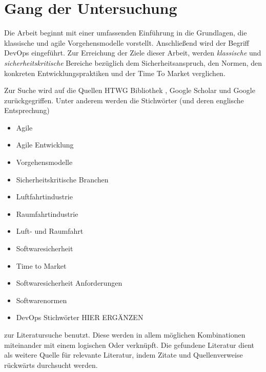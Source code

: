\section{Gang der Untersuchung}

Die Arbeit beginnt mit einer umfassenden Einführung in die Grundlagen,
die klassische und agile Vorgehensmodelle vorstellt.
Anschließend wird der Begriff DevOps eingeführt.
Zur Erreichung der Ziele dieser Arbeit, werden \emph{klassische} und \emph{sicherheitskritische} Bereiche bezüglich dem Sicherheitsanspruch, den Normen, den konkreten Entwicklungspraktiken und der Time To Market verglichen.

Zur Suche wird auf die Quellen HTWG Bibliothek \parencite[vgl.][]{HTWG2015aa}, Google Scholar \parencite[vgl.][]{Google2015aa} und Google \parencite[vgl.][]{Google2015ab} zurückgegriffen.
Unter anderem werden die Stichwörter (und deren englische Entsprechung)
\begin{itemize}
\item Agile
\item Agile Entwicklung
\item Vorgehensmodelle
\item Sicherheitskritische Branchen
\item Luftfahrtindustrie
\item Raumfahrtindustrie
\item Luft- und Raumfahrt
\item Softwaresicherheit
\item Time to Market
\item Softwaresicherheit Anforderungen
\item Softwarenormen
\item DevOps Stichwörter HIER ERGÄNZEN
\end{itemize}
zur Literatursuche benutzt.
Diese werden in allem möglichen Kombinationen miteinander mit einem logischen Oder verknüpft.
Die gefundene Literatur dient als weitere Quelle für relevante Literatur, indem Zitate und Quellenverweise rückwärts durchsucht werden.

